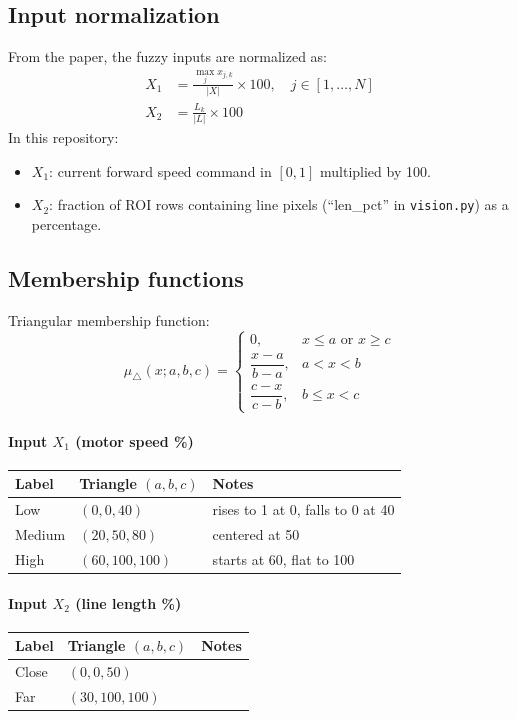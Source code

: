 \documentclass{article}
\begin{document}
\subsection*{Input normalization}
From the paper, the fuzzy inputs are normalized as:
\begin{align}
X_1 &= \frac{\max_j x_{j,k}}{|X|}\times 100, \quad j\in[1,\ldots,N] \\
X_2 &= \frac{L_k}{|L|}\times 100
\end{align}
In this repository:
\begin{itemize}
\item $X_1$: current forward speed command in $[0,1]$ multiplied by 100.
\item $X_2$: fraction of ROI rows containing line pixels (``len\_pct'' in \texttt{vision.py}) as a percentage.
\end{itemize}

\subsection*{Membership functions}
Triangular membership function:
\[
\mu_{\triangle}(x;a,b,c)=
\begin{cases}
0,& x\le a \text{ or } x\ge c\\
\dfrac{x-a}{b-a},& a<x<b\\
\dfrac{c-x}{c-b},& b\le x<c
\end{cases}
\]

\paragraph*{Input $X_1$ (motor speed \%)}
\begin{center}
\begin{tabular}{lll}
\toprule
Label & Triangle $(a,b,c)$ & Notes\\
\midrule
Low    & $(0,0,40)$  & rises to 1 at 0, falls to 0 at 40\\
Medium & $(20,50,80)$& centered at 50\\
High   & $(60,100,100)$& starts at 60, flat to 100\\
\bottomrule
\end{tabular}
\end{center}

\paragraph*{Input $X_2$ (line length \%)}
\begin{center}
\begin{tabular}{lll}
\toprule
Label & Triangle $(a,b,c)$ & Notes\\
\midrule
Close & $(0,0,50)$\\
Far   & $(30,100,100)$\\
\bottomrule
\end{tabular}
\end{center}
\end{document}
